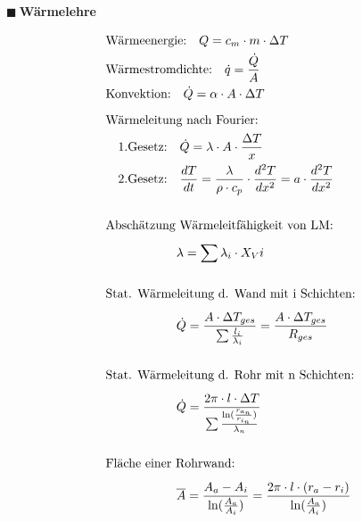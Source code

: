\documentclass[a4paper,10pt]{article}
\renewcommand{\textbf}[1]{\textsf{{\bfseries {#1}}}}
\renewcommand{\plmtsquare}{{\color{miugray} $\blacksquare~$}}
\begin{document}
\begin{minipage}[t]{.45\textwidth}
\vspace*{5.5mm}
\plmtsquare \textbf{Wärmelehre} \par \vspace*{-4mm}
\begin{align*}
&\text{Wärmeenergie:} \quad Q = c_m \cdot m \cdot \Delta T \\
&\text{Wärmestromdichte:} \quad \dot{q} = \frac{\dot{Q}}{A} \\
&\text{Konvektion:} \quad \dot{Q} = \alpha \cdot A \cdot \Delta T \\[6pt] 
&\text{Wärmeleitung nach Fourier:}\\
&\quad \text{1.Gesetz:} \quad \dot{Q} = \lambda \cdot A \cdot \frac{\Delta T}{x} \\
&\quad \text{2.Gesetz:} \quad \frac{dT}{dt} = \frac{\lambda}{\rho \cdot c_p} \cdot \frac{d^2T}{dx^2} = a \cdot \frac{d^2T}{dx^2} \\ \\
&\text{Abschätzung Wärmeleitfähigkeit von LM:}\\[4pt]
& \hspace*{2cm} \lambda = \sum \lambda_i \cdot X_Vi \\ \\
&\text{Stat. Wärmeleitung d. Wand mit i Schichten:}\\[4pt]
&\hspace*{2cm} \dot{Q} = \frac{A \cdot \Delta T_{ges}}{\sum \frac{l_i}{\lambda_i}} = \frac{A \cdot \Delta T_{ges}}{R_{ges}}\\ \\
&\text{Stat. Wärmeleitung d. Rohr mit n Schichten:}\\[4pt]
&\hspace*{2cm} \dot{Q} = \frac{2 \pi \cdot l \cdot \Delta T }{\sum \frac{\ln(\frac{r_{a_n}}{r_{i_n}})}{\lambda_n}} \\ \\
&\text{Fläche einer Rohrwand:}\\[4pt]
& \hspace*{2cm} \overline{A} = \frac{A_a - A_i}{\ln(\frac{A_a}{A_i})} = \frac{2 \pi \cdot l \cdot (r_a - r_i)}{\ln(\frac{A_a}{A_i})} \\
\end{align*}




\end{minipage}
\end{document}
